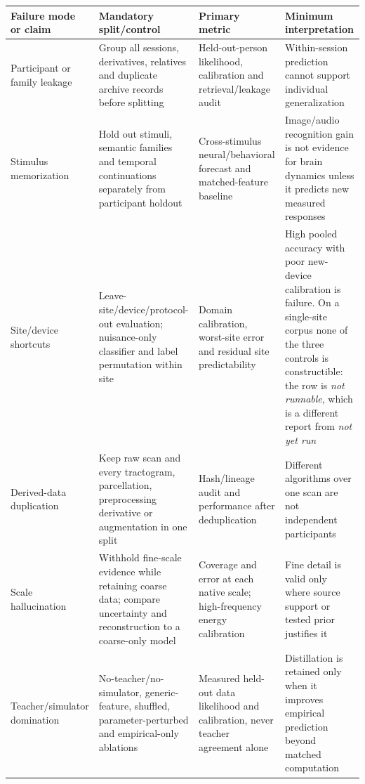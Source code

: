 \begin{table}[!h]
\centering
\footnotesize
\setlength{\tabcolsep}{4pt}
\renewcommand{\arraystretch}{1.10}
\begin{tabularx}{\textwidth}{@{}p{}p{}p{}X@{}}
\toprule
\textbf{Failure mode or claim} & \textbf{Mandatory split/control} &
\textbf{Primary metric} & \textbf{Minimum interpretation}\\
\midrule
Participant or family leakage &
Group all sessions, derivatives, relatives and duplicate archive records
before splitting &
Held-out-person likelihood, calibration and retrieval/leakage audit &
Within-session prediction cannot support individual generalization\\

Stimulus memorization &
Hold out stimuli, semantic families and temporal continuations separately
from participant holdout &
Cross-stimulus neural/behavioral forecast and matched-feature baseline &
Image/audio recognition gain is not evidence for brain dynamics unless it
predicts new measured responses\\

Site/device shortcuts &
Leave-site/device/protocol-out evaluation; nuisance-only classifier and label
permutation within site &
Domain calibration, worst-site error and residual site predictability &
High pooled accuracy with poor new-device calibration is failure. On a
single-site corpus none of the three controls is constructible: the row is
\emph{not runnable}, which is a different report from \emph{not yet run}\\

Derived-data duplication &
Keep raw scan and every tractogram, parcellation, preprocessing derivative or
augmentation in one split &
Hash/lineage audit and performance after deduplication &
Different algorithms over one scan are not independent participants\\

Scale hallucination &
Withhold fine-scale evidence while retaining coarse data; compare uncertainty
and reconstruction to a coarse-only model &
Coverage and error at each native scale; high-frequency energy calibration &
Fine detail is valid only where source support or tested prior justifies it\\

Teacher/simulator domination &
No-teacher/no-simulator, generic-feature, shuffled, parameter-perturbed and
empirical-only ablations &
Measured held-out data likelihood and calibration, never teacher agreement
alone &
Distillation is retained only when it improves empirical prediction beyond
matched computation\\


\end{tabularx}
\end{table}
